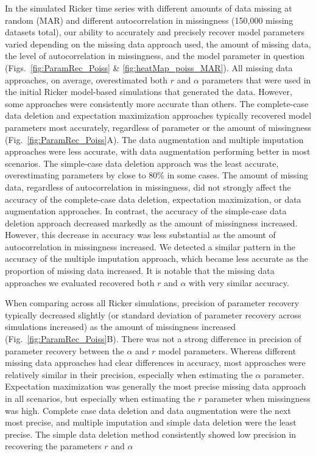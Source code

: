 In the simulated Ricker time series with different amounts of data missing at random (MAR) and different autocorrelation in missingness (150,000 missing datasets total), our ability to accurately and precisely recover model parameters varied depending on the missing data approach used, the amount of missing data, the level of autocorrelation in missingness, and the model parameter in question (Figs.\ \ref{fig:ParamRec_Poiss} \& \ref{fig:heatMap_poiss_MAR}). All missing data approaches, on average, overestimated both $r$ and $\alpha$ parameters that were used in the initial Ricker model-based simulations that generated the data. However, some approaches were consistently more accurate than others. The complete-case data deletion and expectation maximization approaches typically recovered model parameters most accurately, regardless of parameter or the amount of missingness (Fig.\ \ref{fig:ParamRec_Poiss}A). The data augmentation and multiple imputation approaches were less accurate, with data augmentation performing better in most scenarios. The simple-case data deletion approach was the least accurate, overestimating parameters by close to 80\% in some cases. The amount of missing data, regardless of autocorrelation in missingness, did not strongly affect the accuracy of the complete-case data deletion, expectation maximization, or data augmentation approaches. In contrast, the accuracy of the simple-case data deletion approach decreased markedly as the amount of missingness increased. However, this decrease in accuracy was less substantial as the amount of autocorrelation in missingness increased. We detected a similar pattern in the accuracy of the multiple imputation approach, which became less accurate as the proportion of missing data increased. It is notable that the missing data approaches we evaluated recovered both $r$ and $\alpha$  with very similar accuracy. 

When comparing across all Ricker simulations, precision of parameter recovery typically decreased slightly (or standard deviation of parameter recovery across simulations increased) as the amount of missingness increased (Fig.\ \ref{fig:ParamRec_Poiss}B). There was not a strong difference in precision of parameter recovery between the $\alpha$ and $r$ model parameters. Whereas different missing data approaches had clear differences in accuracy, most approaches were relatively similar in their precision, especially when estimating the $\alpha$ parameter. Expectation maximization was generally the most precise missing data approach in all scenarios, but especially when estimating the $r$ parameter when missingness was high. Complete case data deletion and data augmentation were the next most precise, and multiple imputation and simple data deletion were the least precise. The simple data deletion method consistently showed low precision in recovering the parameters $r$ and $\alpha$




